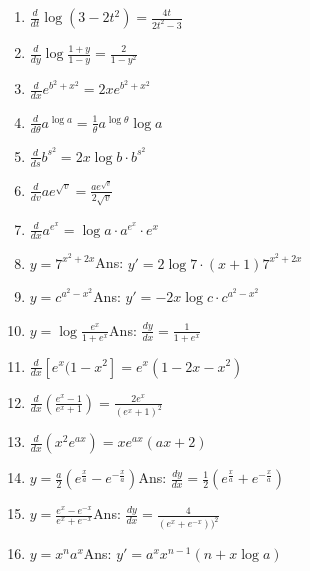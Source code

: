 \begin{enumerate}
\item
$\frac{d}{dt} \log(3 - 2t^2) = \frac{4t}{2t^2 - 3}$

\item
$\frac{d}{dy} \log \frac{1 + y}{1 - y} = \frac{2}{1 - y^2}$

\item
$\frac{d}{dx}e^{b^2 + x^2} = 2xe^{b^2 + x^2}$

\item
$\frac{d}{d\theta} a^{\log a} = \frac{1}{\theta} a^{\log \theta} \log a$

\item
$\frac{d}{ds}b^{s^2} = 2x \log b \cdot b^{s^2}$

\item
$\frac{d}{dv} ae^{\sqrt{v}} = \frac{ae^{\sqrt{v}}}{2\sqrt{v}}$

\item
$\frac{d}{dx} a^{e^x} = \log a \cdot a^{e^x} \cdot e^x$

\item
$y = 7^{x^2 + 2x}$\qquad\qquad\qquad\qquad\qquad\qquad Ans: 	$y' = 2\log 7 \cdot (x + 1) 7^{x^2 + 2x}$

\item
$y = c^{a^2 - x^2}$\qquad\qquad\qquad\qquad\qquad\qquad Ans: 	$y' = -2x \log c \cdot c^{a^2 - x^2}$

\item
$y = \log \frac{e^x}{1 + e^x}$\qquad\qquad\qquad\qquad\qquad\qquad Ans: 	$\frac{dy}{dx} = \frac{1}{1 + e^x}$

\item
$\frac{d}{dx} \left [ e^x ( 1- x^2 \right ] = e^x (1 - 2x - x^2)$

\item
$\frac{d}{dx} \left ( \frac{e^x - 1}{e^x + 1} \right ) = \frac{2e^x}{(e^x + 1)^2}$

\item
$\frac{d}{dx} \left ( x^2 e^{ax} \right ) = xe^{ax}(ax + 2)$

\item
$y = \frac{a}{2} (e^{\frac{x}{a}} - e^{-\frac{x}{a}})$\qquad\qquad\qquad\qquad\qquad\qquad Ans: 	
$\frac{dy}{dx} = \frac{1}{2} (e^{\frac{x}{a}} + e^{-\frac{x}{a}})$

\item
$y = \frac{e^x - e^{-x}}{e^x + e^{-x}}$\qquad\qquad\qquad\qquad\qquad\qquad Ans: 	$\frac{dy}{dx} = \frac{4}{(e^x + e^{-x}))^2}$

\item
$y = x^na^x$\qquad\qquad\qquad\qquad\qquad\qquad Ans: 	$y' = a^xx^{n - 1}(n + x\log a)$


\end{enumerate}

